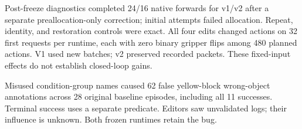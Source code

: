 Post-freeze diagnostics completed 24/16 native forwards for v1/v2 after a separate preallocation-only correction; initial attempts failed allocation. Repeat, identity, and restoration controls were exact. All four edits changed actions on 32 first requests per runtime, each with zero binary gripper flips among 480 planned actions. V1 used new batches; v2 preserved recorded packets. These fixed-input effects do not establish closed-loop gains.

Misused condition-group names caused 62 false yellow-block wrong-object annotations across 28 original baseline episodes, including all 11 successes. Terminal success uses a separate predicate. Editors saw unvalidated logs; their influence is unknown. Both frozen runtimes retain the bug.
